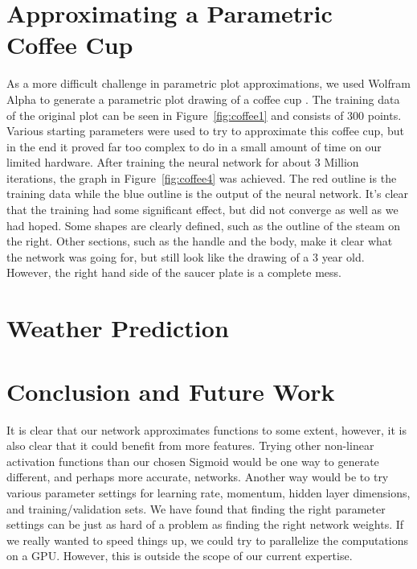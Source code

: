 \documentclass{article}
\begin{document}
\begin{multicols}{2}
\section{Approximating a Parametric Coffee Cup}

As a more difficult challenge in parametric plot approximations, we used Wolfram Alpha to generate a parametric plot drawing of a coffee cup \cite{wolfram}. The training data of the original plot can be seen in Figure~\ref{fig:coffee1} and consists of 300 points. Various starting parameters were used to try to approximate this coffee cup, but in the end it proved far too complex to do in a small amount of time on our limited hardware. After training the neural network for about 3 Million iterations, the graph in Figure~\ref{fig:coffee4} was achieved. The red outline is the training data while the blue outline is the output of the neural network. It's clear that the training had some significant effect, but did not converge as well as we had hoped. Some shapes are clearly defined, such as the outline of the steam on the right. Other sections, such as the handle and the body, make it clear what the network was going for, but still look like the drawing of a 3 year old. However, the right hand side of the saucer plate is a complete mess.

\section{Weather Prediction}

\section{Conclusion and Future Work}

It is clear that our network approximates functions to some extent, however, it is also clear that it could benefit from more features. Trying other non-linear activation functions than our chosen Sigmoid would be one way to generate different, and perhaps more accurate, networks. Another way would be to try various parameter settings for learning rate, momentum, hidden layer dimensions, and training/validation sets. We have found that finding the right parameter settings can be just as hard of a problem as finding the right network weights. If we really wanted to speed things up, we could try to parallelize the computations on a GPU. However, this is outside the scope of our current expertise.




\end{multicols}
\end{document}
